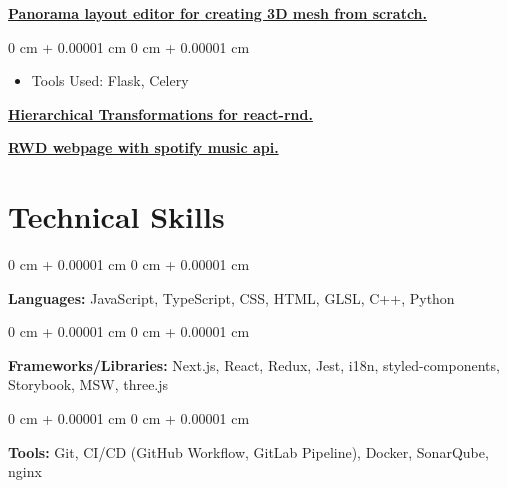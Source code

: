 \documentclass[10pt, letterpaper]{article}
\newenvironment{highlights}{
    \begin{itemize}[
        topsep=0.10 cm,
        parsep=0.10 cm,
        partopsep=0pt,
        itemsep=0pt,
        leftmargin=0 cm + 10pt
    ]
}{
    \end{itemize}
} %
\newenvironment{onecolentry}{
    \begin{adjustwidth}{
        0 cm + 0.00001 cm
    }{
        0 cm + 0.00001 cm
    }
}{
    \end{adjustwidth}
} %
\begin{document}
        \vspace{0.2 cm}

        \href{https://github.com/tsengyushiang/pano-to-mesh}{\textbf{Panorama layout editor for creating 3D mesh from scratch.}}
        \vspace{0.10 cm}
        \begin{onecolentry}
            \begin{highlights}
                \item Tools Used: Flask, Celery
            \end{highlights}
        \end{onecolentry}

        \vspace{0.2 cm}

        \href{https://github.com/tsengyushiang/react-rnd-group}{\textbf{Hierarchical Transformations for react-rnd.}}

        \vspace{0.2 cm}
        \href{https://spotify-kappa-three.vercel.app/}{\textbf{RWD webpage with spotify music api.}}
        

    \section{Technical Skills}

        \begin{onecolentry}
            \textbf{Languages:} JavaScript, TypeScript, CSS, HTML, GLSL, C++, Python
        \end{onecolentry}

        \vspace{0.2 cm}

        \begin{onecolentry}
            \textbf{Frameworks/Libraries:} Next.js, React, Redux, Jest, i18n, styled-components, Storybook, MSW, three.js
        \end{onecolentry}

        \vspace{0.2 cm}

        \begin{onecolentry}
            \textbf{Tools:} Git, CI/CD (GitHub Workflow, GitLab Pipeline), Docker, SonarQube, nginx
        \end{onecolentry}
\end{document}
